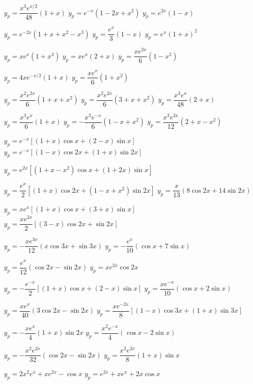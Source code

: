  $y_p=\dfrac{x^3e^{x/2}}{48}(1+x)$
 $y_p=e^{-x}(1-2x+x^2)$
 $y_p=e^{2x}(1-x)$

 $y_p=e^{-2x}(1+x+x^2-x^3)$
 $y_p=\dfrac{e^x}{3}(1-x)$
 $y_p=e^x(1+x)^2$

 $y_p=xe^x(1+x^3)$
 $y_p=xe^x(2+x)$
 $y_p=\dfrac{xe^{2x}}{6}(1-x^2)$

 $y_p=4xe^{-x/2}(1+x)$
 $y_p=\dfrac{xe^x}{6}(1+x^2)$

   $y_p=\dfrac{x^2e^{2x}}{6}(1+x+x^2)$
   $y_p=\dfrac{x^2e^{2x}}{6}(3+x+x^2)$
 $y_p=\dfrac{x^3e^x}{48}(2+x)$

  $y_p=\dfrac{x^3e^x}{6}(1+x)$
  $y_p=-\dfrac{x^3e^{-x}}{6}(1-x+x^2)$
  $y_p=\dfrac{x^3e^{2x}}{12}(2+x-x^2)$

 $y_p=e^{-x}\left[(1+x)\cos x+(2-x)\sin x\right]$
 $y_p=e^{-x}\left[(1-x)\cos2x+(1+x)\sin2
x\right]$

 $y_p=e^{2x}[(1+x-x^2)\cos x+(1+2x)\sin
x]$

 $y_p=\dfrac{e^x}{2}[(1+x)\cos
2x+(1-x+x^2)\sin2x]$
 $y_p=\dfrac{x}{13}(8\cos2x+14\sin2x)$

 $y_p=xe^x[(1+x)\cos x+(3+x)\sin x]$
 $y_p=\dfrac{xe^{2x}}{2}[(3-x)\cos
2x+\sin2x]$

 $y_p=-\dfrac{xe^{3x}}{12}(x\cos
3x+\sin3x)$
 $y_p=-\dfrac{e^x}{10}(\cos x+7\sin x)$

 $y_p=\dfrac{e^x}{12}(\cos2x-\sin2x)$
 $y_p=xe^{2x}\cos2x$

 $y_p=-\dfrac{e^{-x}}{2}[(1+x)\cos
x+(2-x)\sin x]$
 $y_p=\dfrac{xe^{-x}}{10}(\cos x+2\sin x)$

 $y_p=\dfrac{xe^x}{40}(3\cos2x-\sin2x)$
 $y_p=\dfrac{xe^{-2x}}{8}[(1-x)\cos
3x+(1+x)\sin3x]$

 $y_p=-\dfrac{xe^x}{4}(1+x)\sin2x$
 $y_p=\dfrac{x^2e^{-x}}{4}(\cos x-2\sin x)$

 $y_p=-\dfrac{x^2e^{2x}}{32}(\cos2x-\sin2x)$
 $y_p=\dfrac{x^2e^{2x}}{8}(1+x)\sin x$

 $y_p=2x^2e^x+xe^{2x}-\cos x$
 $y_p=e^{2x}+xe^x+2x\cos x$

